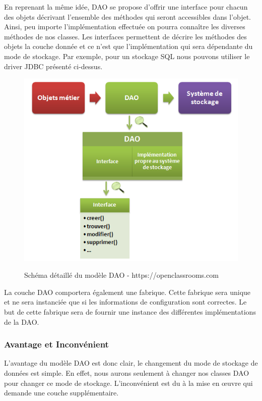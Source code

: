 En reprenant la même idée, DAO se propose d'offrir une interface pour chacun des objets décrivant l'ensemble des méthodes qui seront accessibles dans l'objet. Ainsi, peu importe l'implémentation effectuée on pourra connaître les diverses méthodes de nos classes. Les interfaces permettent de décrire les méthodes des objets la couche donnée et ce n'est que l'implémentation qui sera dépendante du mode de stockage. Par exemple, pour un stockage SQL nous pouvons utiliser le driver JDBC présenté ci-dessus.\\ 
\begin{figure}[!h]
  \center
  \includegraphics[scale=0.5]{../graph/dao2.png} \\
  \caption{Schéma détaillé du modèle DAO - https://openclassrooms.com}
\end{figure}

La couche DAO comportera également une fabrique. Cette fabrique sera unique et ne sera instanciée que si les informations de configuration sont correctes. Le but de cette fabrique sera de fournir une instance des différentes implémentations de la DAO.

\subsubsection{Avantage et Inconvénient}
L'avantage du modèle DAO est donc clair, le changement du mode de stockage de données est simple. En effet, nous aurons seulement à changer nos classes DAO pour changer ce mode de stockage. L'inconvénient est du à la mise en œuvre qui demande une couche supplémentaire. 



